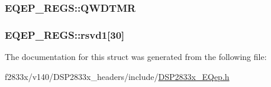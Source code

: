 \subsubsection[{Q\+W\+D\+T\+M\+R}]{ E\+Q\+E\+P\+\_\+\+R\+E\+G\+S\+::\+Q\+W\+D\+T\+M\+R}\label{struct_e_q_e_p___r_e_g_s_a313d77931944d22637cbabaf38964e39}
\hypertarget{struct_e_q_e_p___r_e_g_s_a3a86a2aa28b8a1a9815a7b1aa0941051}{}
\subsubsection[{rsvd1}]{ E\+Q\+E\+P\+\_\+\+R\+E\+G\+S\+::rsvd1\mbox{[}30\mbox{]}}\label{struct_e_q_e_p___r_e_g_s_a3a86a2aa28b8a1a9815a7b1aa0941051}


The documentation for this struct was generated from the following file\+:\begin{DoxyCompactItemize}
\item 
f2833x/v140/\+D\+S\+P2833x\+\_\+headers/include/\hyperlink{_d_s_p2833x___e_qep_8h}{D\+S\+P2833x\+\_\+\+E\+Qep.\+h}\end{DoxyCompactItemize}
